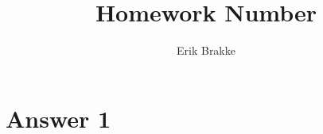 \documentclass[11pt]{article}
\theoremstyle{definition}
\begin{document}
\title{Homework Number}
\author{Erik Brakke}
\maketitle

\thispagestyle{fancy}
 
 
\section*{Answer 1}
\end{document}
